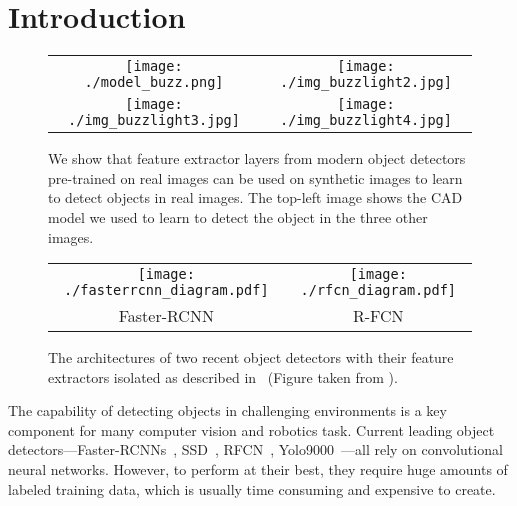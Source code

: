 \documentclass[10pt,twocolumn,letterpaper]{article}
\newcommand{\comment}[1]{}
\newcommand{\imgspace}[0]{\hspace{-0.3cm}}
\begin{document}
\section{Introduction}
\label{sec:introduction}

\begin{figure}[ht]
\begin{center}
\begin{tabular}{cc}
\texttt{[image: ./model\_buzz.png]} & \imgspace
\texttt{[image: ./img\_buzzlight2.jpg]} \\
\texttt{[image: ./img\_buzzlight3.jpg]} & \imgspace
\texttt{[image: ./img\_buzzlight4.jpg]} \\
\end{tabular}
\end{center}
\caption{\label{fig:overview}
We show that feature extractor layers from modern object detectors pre-trained on real images 
can be used on synthetic images to learn to detect objects
in real images. The top-left image shows the CAD model we used to
learn to detect the object in the three other images. }
\comment{
In this  paper,  we show  how a  simple
  trick enables  learning deep object detectors  purely from synthetic
  data.  In the  upper left image we  see one of the 3D  CAD models we
  learn from and  the remaining images show the  object detected under
  various  poses in  a heavily  cluttered environments.  We achieve  a
  detection performance  up to  $95\%$ of a  detector trained  on real
  data.}
\end{figure}

\begin{figure*}[ht]
\begin{center}
\begin{tabular}{cc}
\texttt{[image: ./fasterrcnn\_diagram.pdf]} &
\texttt{[image: ./rfcn\_diagram.pdf]} \\
Faster-RCNN &
R-FCN \\
\end{tabular}
\end{center}
\caption{\label{fig:metaarchitecture} The architectures of two recent object
  detectors with their feature extractors isolated as described
  in~\cite{Huang17} (Figure taken from \cite{Huang17}).}
\end{figure*}

 
The  capability  of detecting  objects  in  challenging  environments is  a  key
component for  many computer vision  and robotics task.  Current  leading object
detectors---Faster-RCNNs~\cite{faster_rcnn},  SSD~\cite{ssd},  RFCN~\cite{rfcn},
Yolo9000~\cite{redmon16}---all rely  on convolutional neural  networks.  However,
to perform  at their best, they  require huge amounts of  labeled training data,
which is usually time consuming and expensive to create.
\end{document}
